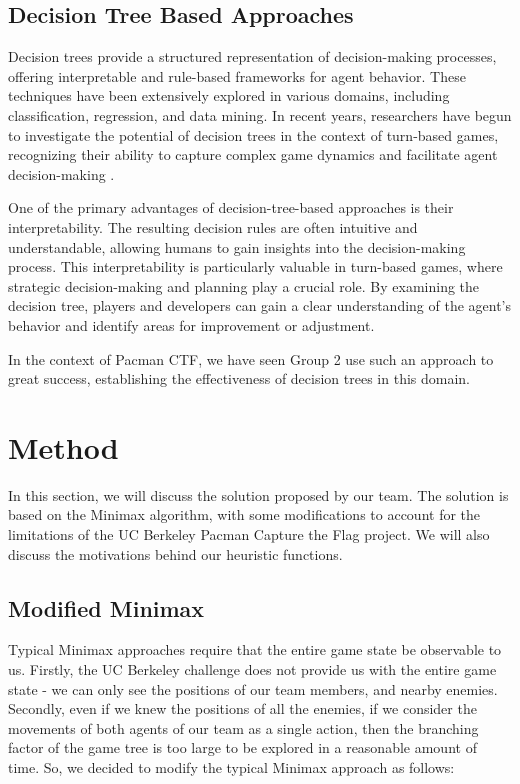 \documentclass[a4paper,12pt]{article}
\begin{document}
\subsection{Decision Tree Based Approaches}
\label{subsec:decision_tree}

Decision trees provide a structured representation of decision-making processes, offering interpretable and rule-based frameworks for agent behavior. These techniques have been extensively explored in various domains, including classification, regression, and data mining. In recent years, researchers have begun to investigate the potential of decision trees in the context of turn-based games, recognizing their ability to capture complex game dynamics and facilitate agent decision-making \cite{Hastie2009}.

One of the primary advantages of decision-tree-based approaches is their interpretability. The resulting decision rules are often intuitive and understandable, allowing humans to gain insights into the decision-making process. This interpretability is particularly valuable in turn-based games, where strategic decision-making and planning play a crucial role. By examining the decision tree, players and developers can gain a clear understanding of the agent's behavior and identify areas for improvement or adjustment.

In the context of Pacman CTF, we have seen Group 2 use such an approach to great success, establishing the effectiveness of decision trees in this domain. 


\section{Method}
\label{method}

In this section, we will discuss the solution proposed by our team. The solution is based on the Minimax algorithm, with some modifications to account for the limitations of the UC Berkeley Pacman Capture the Flag project. We will also discuss the motivations behind our heuristic functions.

\subsection{Modified Minimax}
\label{subsec:modified_minimax}
Typical Minimax approaches require that the entire game state be observable to us. Firstly, the UC Berkeley challenge does not provide us with the entire game state - we can only see the positions of our team members, and nearby enemies. Secondly, even if we knew the positions of all the enemies, if we consider the movements of both agents of our team as a single action, then the branching factor of the game tree is too large to be explored in a reasonable amount of time. So, we decided to modify the typical Minimax approach as follows:
\end{document}
